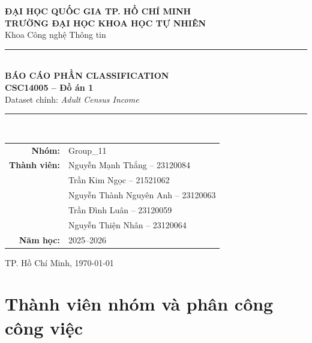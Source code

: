 \documentclass[12pt,a4paper]{article}
\newcommand{\adult}{\textit{Adult Census Income}}
\begin{document}
\begin{titlepage}
\thispagestyle{empty}
\centering
\vspace*{1.15cm}
{\Large \textbf{ĐẠI HỌC QUỐC GIA TP. HỒ CHÍ MINH}}\\[0.15cm]
{\Large \textbf{TRƯỜNG ĐẠI HỌC KHOA HỌC TỰ NHIÊN}}\\[0.25cm]
{\large Khoa Công nghệ Thông tin}\\[2.0cm]

{\color{HCMUSBlue}\rule{0.68\linewidth}{0.7pt}}\\[0.75cm]
{\fontsize{24}{30}\selectfont\bfseries\color{HCMUSBlue} BÁO CÁO PHẦN CLASSIFICATION}\\[0.45cm]
{\Large\bfseries CSC14005 -- Đồ án 1}\\[0.35cm]
{\large Dataset chính: \adult}\\[0.75cm]
{\color{HCMUSBlue}\rule{0.68\linewidth}{0.7pt}}\\[1.4cm]

\begin{tabular}{rl}
\textbf{Nhóm:} & Group\_11 \\[4pt]
\textbf{Thành viên:} & Nguyễn Mạnh Thắng -- 23120084 \\
& Trần Kim Ngọc -- 21521062 \\
& Nguyễn Thành Nguyên Anh -- 23120063 \\
& Trần Đình Luân -- 23120059 \\
& Nguyễn Thiện Nhân -- 23120064 \\[4pt]
\textbf{Năm học:} & 2025--2026
\end{tabular}

\vfill
{\large TP. Hồ Chí Minh, \today}
\end{titlepage}

\tableofcontents
\newpage

\section{Thành viên nhóm và phân công công việc}
\end{document}
